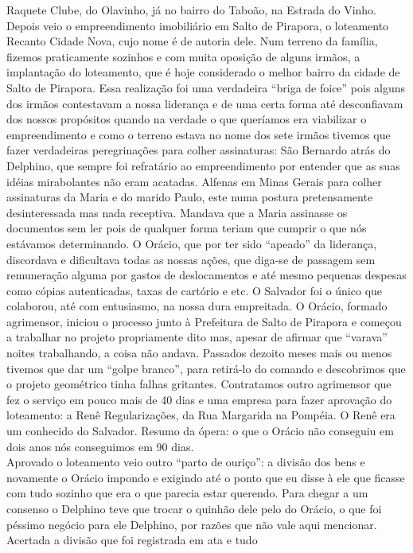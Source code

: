\documentclass[12pt,brazil,]{book}
\begin{document}
Raquete Clube, do Olavinho, já no bairro do Taboão, na Estrada do Vinho.
Depois veio o empreendimento imobiliário em Salto de Pirapora, o
loteamento Recanto Cidade Nova, cujo nome é de autoria dele. Num terreno
da família, fizemos praticamente sozinhos e com muita oposição de alguns
irmãos, a implantação do loteamento, que é hoje considerado o melhor
bairro da cidade de Salto de Pirapora. Essa realização foi uma
verdadeira ``briga de foice'' pois alguns dos irmãos contestavam a nossa
liderança e de uma certa forma até desconfiavam dos nossos propósitos
quando na verdade o que queríamos era viabilizar o empreendimento e como
o terreno estava no nome dos sete irmãos tivemos que fazer verdadeiras
peregrinações para colher assinaturas: São Bernardo atrás do Delphino,
que sempre foi refratário ao empreendimento por entender que as suas
idéias mirabolantes não eram acatadas. Alfenas em Minas Gerais para
colher assinaturas da Maria e do marido Paulo, este numa postura
pretensamente desinteressada mas nada receptiva. Mandava que a Maria
assinasse os documentos sem ler pois de qualquer forma teriam que
cumprir o que nós estávamos determinando. O Orácio, que por ter sido
``apeado'' da liderança, discordava e dificultava todas as nossas ações,
que diga-se de passagem sem remuneração alguma por gastos de
deslocamentos e até mesmo pequenas despesas como cópias autenticadas,
taxas de cartório e etc. O Salvador foi o único que colaborou, até com
entusiasmo, na nossa dura empreitada. O Orácio, formado agrimensor,
iniciou o processo junto à Prefeitura de Salto de Pirapora e começou a
trabalhar no projeto propriamente dito mas, apesar de afirmar que
``varava'' noites trabalhando, a coisa não andava. Passados dezoito
meses mais ou menos tivemos que dar um ``golpe branco'', para retirá-lo
do comando e descobrimos que o projeto geométrico tinha falhas
gritantes. Contratamos outro agrimensor que fez o serviço em pouco mais
de 40 dias e uma empresa para fazer aprovação do loteamento: a Renê
Regularizações, da Rua Margarida na Pompéia. O Renê era um conhecido do
Salvador. Resumo da ópera: o que o Orácio não conseguiu em dois anos nós
conseguimos em 90 dias.\\
Aprovado o loteamento veio outro ``parto de ouriço'': a divisão dos bens
e novamente o Orácio impondo e exigindo até o ponto que eu disse à ele
que ficasse com tudo sozinho que era o que parecia estar querendo. Para
chegar a um consenso o Delphino teve que trocar o quinhão dele pelo do
Orácio, o que foi péssimo negócio para ele Delphino, por razões que não
vale aqui mencionar. Acertada a divisão que foi registrada em ata e tudo
\end{document}
